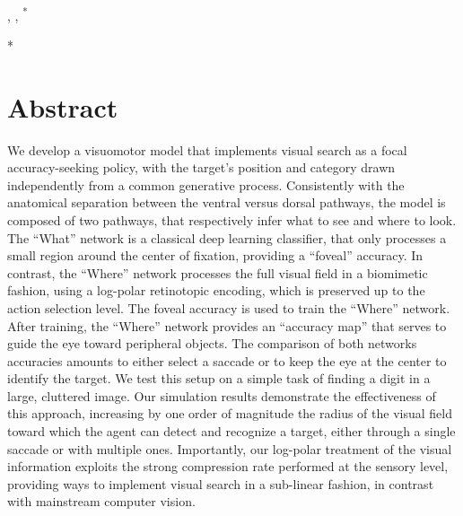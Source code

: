 \documentclass[10pt,a4paper]{article}
\begin{document}
\linenumbers

\begin{flushleft}
{\Large
\textbf\newline{
\Title
} %
}
\newline
\\
\AuthorED, %
\AuthorPA, %
\AuthorLP\textsuperscript{*}%
\\
\bigskip
\Address
\bigskip

* \EmailLP

\end{flushleft}
\section*{Abstract}
We develop a visuomotor model that implements visual search as a focal accuracy-seeking policy, with the target's position and category drawn independently from a common generative process.  Consistently with the anatomical separation between the ventral versus dorsal pathways, the model is composed of two pathways, that respectively infer what to see and where to look. The ``What'' network is a classical deep learning classifier, that only processes a small region around the center of fixation, providing a ``foveal'' accuracy. In contrast, the ``Where'' network processes the full visual field in a biomimetic fashion, using a log-polar retinotopic encoding, which is preserved up to the action selection level. The foveal accuracy is used to train the ``Where'' network. After training, the ``Where'' network provides an ``accuracy map'' that serves to guide the eye toward peripheral objects. The comparison of both networks accuracies amounts to either select a saccade or to keep the eye at the center to identify the target. We test this setup on a simple task of finding a digit in a large, cluttered image.  Our simulation results demonstrate the effectiveness of this approach, increasing by one order of magnitude the radius of the visual field toward which the agent can detect and recognize a target, either through a single saccade or with multiple ones. Importantly, our log-polar treatment of the visual information exploits the strong compression rate performed at the sensory level, providing ways to implement visual search in a sub-linear fashion, in contrast with mainstream computer vision.
%








\nolinenumbers



%
\end{document}

